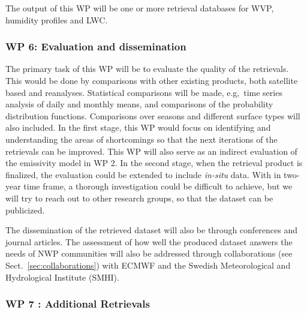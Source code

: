 \documentclass[12pt,oneside,a4paper]{article}
\begin{document}
The output of this WP will be one or more retrieval databases for WVP, humidity profiles and LWC.
\vspace{-1.0ex}
\subsubsection*{WP 6: Evaluation and dissemination}
%
\label{sec:evaluation}
The primary task of this WP will be to evaluate the quality of the retrievals.  This would be done by comparisons with other existing products, both satellite based and reanalyses. Statistical comparisons will be made, e.g,\, time series analysis of daily and monthly means, and comparisons of the probability
distribution functions. Comparisons over seasons and different surface types will also included. In the first stage, this WP would focus on identifying and understanding the areas of shortcomings so that the next iterations of the retrievals can be improved. This WP will also serve as an indirect evaluation of the emissivity model in WP 2. In the second stage, when the retrieval product is finalized, the evaluation could be extended to include \textit{in-situ} data. With in two-year time frame, a thorough investigation could be difficult to achieve, but we will try to reach out to other research groups, so that the dataset can be publicized. 
 

The dissemination of the retrieved dataset will also be through conferences and journal articles. The assessment of how well the produced dataset answers the needs of NWP communities will also be addressed through collaborations (see Sect.~\ref{sec:collaborations}) with ECMWF and the Swedish Meteorological and Hydrological Institute (SMHI). 
\vspace{-1.0ex}
\subsubsection*{WP 7 : Additional Retrievals}
%
\label{sec:other_retrievals}
\end{document}
